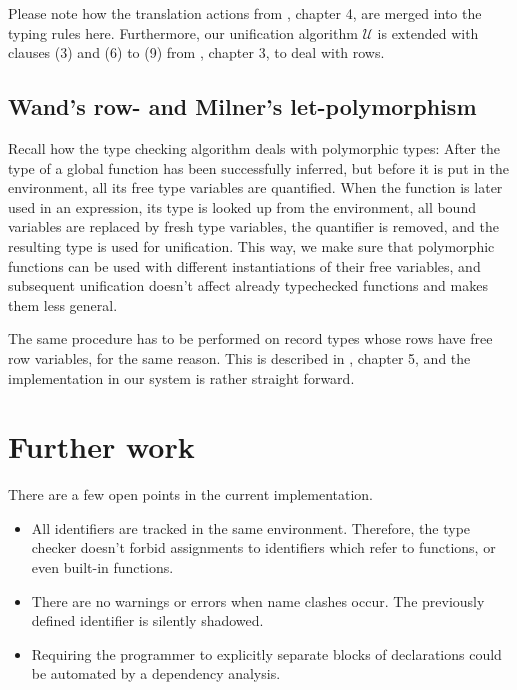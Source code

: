 \documentclass[a4paper]{article}
\begin{document}
Please note how the translation actions from \cite{Wand87b}, chapter 4, are
merged into the typing rules here.  Furthermore, our unification algorithm
$\mathcal{U}$ is extended with clauses (3) and (6) to (9) from \cite{Wand87b},
chapter 3, to deal with rows.

\subsection{Wand's row- and Milner's let-polymorphism}

Recall how the type checking algorithm deals with polymorphic types:  After the
type of a global function has been successfully inferred, but before it is put
in the environment, all its free type variables are quantified.  When the
function is later used in an expression, its type is looked up from the
environment, all bound variables are replaced by fresh type variables, the
quantifier is removed, and the resulting type is used for unification.  This
way, we make sure that polymorphic functions can be used with different
instantiations of their free variables, and subsequent unification doesn't
affect already typechecked functions and makes them less general.

The same procedure has to be performed on record types whose rows have free row
variables, for the same reason.  This is described in \cite{Wand87b}, chapter 5,
and the implementation in our system is rather straight forward.

\section{Further work}

There are a few open points in the current implementation.

\begin{itemize}

  \item All identifiers are tracked in the same environment.  Therefore, the
  type checker doesn't forbid assignments to identifiers which refer to
  functions, or even built-in functions.

  \item There are no warnings or errors when name clashes occur.  The previously
  defined identifier is silently shadowed.

  \item Requiring the programmer to explicitly separate blocks of declarations
  could be automated by a dependency analysis.

\end{itemize}
\end{document}
